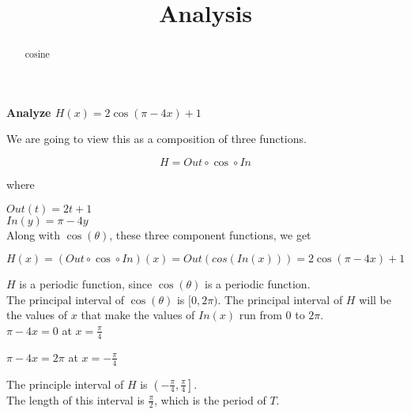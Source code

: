 \documentclass{ximera}
\title{Analysis}
\begin{document}
\begin{abstract}
cosine
\end{abstract}
\maketitle












\textbf{\textcolor{purple!85!blue}{Analyze  $H(x) =  2 \cos(\pi - 4x) + 1$}}





\begin{template}


We are going to view this as a composition of three functions.


\[
H = Out \circ \cos \circ In
\]


where


$Out(t) = 2t + 1$ \\


$In(y) = \pi - 4y$ \\




Along with $\cos(\theta)$, these three component functions, we get



\[
H(x) = (Out \circ \cos \circ In)(x) = Out(cos(In(x)))  = 2 \cos(\pi - 4x) + 1
\]




\end{template}

$H$ is a periodic function, since $\cos(\theta)$ is a periodic function. \\

The principal interval of $\cos(\theta)$ is $[0, 2\pi)$.  The principal interval of $H$ will be the values of $x$ that make the values of $In(x)$ run from $0$ to $2\pi$. \\


$\pi - 4x = 0$ at $x = \frac{\pi}{4}$

$\pi - 4x = 2\pi$ at $x = -\frac{\pi}{4}$

The principle interval of $H$ is $\left( -\frac{\pi}{4}, \frac{\pi}{4} \right]$. \\

The length of this interval is $\frac{\pi}{2}$, which is the period of $T$. \\
\end{document}
